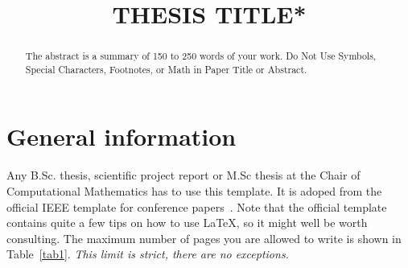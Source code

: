 \documentclass[conference]{IEEEtran}
\begin{document}
\title{THESIS TITLE*}

\author{
\and
{}
\and
{}
}

\maketitle

\begin{abstract}
The abstract is a summary of 150 to 250 words of your work. Do Not Use Symbols, Special Characters, Footnotes, 
or Math in Paper Title or Abstract.
\end{abstract}

\section{General information}
Any B.Sc. thesis, scientific project report or M.Sc thesis at the Chair of Computational Mathematics has to use this template.
It is adoped from the official IEEE template for conference papers~\cite{ieee-latex}.
Note that the official template contains quite a few tips on how to use LaTeX, so it might well be worth consulting.
The maximum number of pages you are allowed to write is shown in Table~\ref{tab1}.
\emph{This limit is strict, there are no exceptions.}

\end{document}
